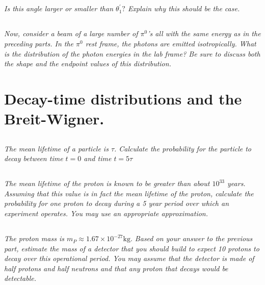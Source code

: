 \documentclass{article}
\begin{document}
\subsection{}
\textit{Is this angle larger or smaller than $\theta_{1}^{\prime} ?$ Explain why this should be the case.}

\subsection{}
\textit{Now, consider a beam of a large number of $\pi^{0}$'s all with the same energy as in the preceding parts. In the $\pi^{0}$ rest frame, the photons are emitted isotropically. What is the distribution of the photon energies in the lab frame? Be sure to discuss both the shape and the endpoint values of this distribution.}

\section{Decay-time distributions and the Breit-Wigner.}
\subsection{}
\textit{The mean lifetime of a particle is $\tau$. Calculate the probability for the particle to decay between time $t=0$ and time $t=5 \tau$}
\subsection{}
\textit{The mean lifetime of the proton is known to be greater than about $10^{33}$ years. Assuming that this value is in fact the mean lifetime of the proton, calculate the probability for one proton to decay during a 5 year period over which an experiment operates. You may use an appropriate approximation.}


\subsection{}
\textit{The proton mass is $m_{P} \approx 1.67 \times 10^{-27} \mathrm{kg} .$ Based on your answer to the previous part, estimate the mass of a detector that you should build to expect 10 protons to decay over this operational period. You may assume that the detector is made of half protons and half neutrons and that any proton that decays would be detectable.}
\end{document}

